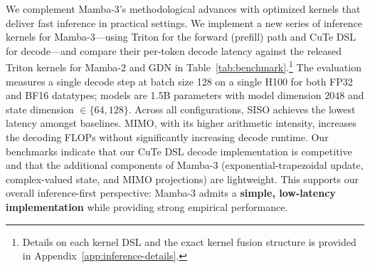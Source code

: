 \begin{table}[t!]
\centering
\caption{Prefill and Prefill+Decode latency across sequence lengths. Mamba-3 adds minimal overhead to its forward-pass and retains competitive decode latencies. Details in .
}
\label{tab:full-latency}
\end{table}

We complement Mamba-3's methodological advances with optimized kernels that deliver fast inference in practical settings.
We implement a new series of inference kernels for Mamba-3---using Triton for the forward (prefill) path and CuTe DSL for decode---and compare their per-token decode latency against the released Triton kernels for Mamba-2 and GDN in Table~\ref{tab:benchmark}.\footnote{Details on each kernel DSL and the exact kernel fusion structure is provided in Appendix~\ref{app:inference-details}.}
The evaluation measures a single decode step at batch size 128 on a single H100 for both FP32 and BF16 datatypes; models are 1.5B parameters with model dimension $2048$ and state dimension $\in \{64, 128\}$.
Across all configurations, SISO achieves the lowest latency amongst baselines.
MIMO, with its higher arithmetic intensity, increases the decoding FLOPs without significantly increasing decode runtime.
Our benchmarks indicate that our CuTe DSL decode implementation is competitive and that the additional components of Mamba-3 (exponential-trapezoidal update, complex-valued state, and MIMO projections) are lightweight.
This supports our overall inference-first perspective: Mamba-3 admits a \textbf{simple, low-latency implementation} while providing strong empirical performance.

